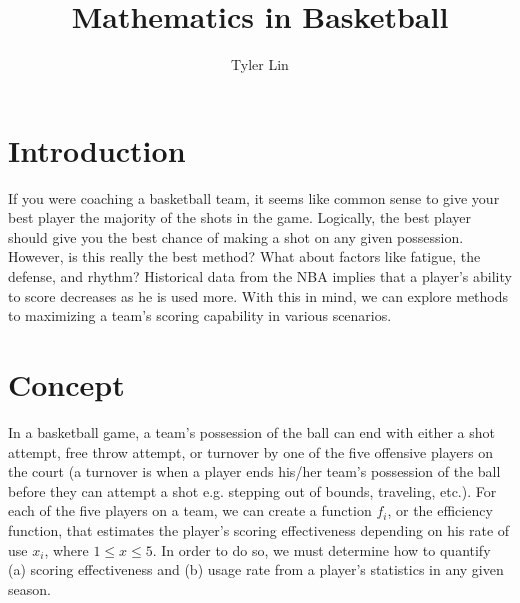 \documentclass{article}
\title{Mathematics in Basketball}
\author{Tyler Lin}
\begin{document}
\maketitle
\section*{Introduction}
If you were coaching a basketball team, it seems like common sense to give your best player the majority of the shots in the game. Logically, the best player should give you the best chance of making a shot on any given possession. However, is this really the best method? What about factors like fatigue, the defense, and rhythm? Historical data from the NBA implies that a player's ability to score decreases as he is used more. With this in mind, we can explore methods to maximizing a team's scoring capability in various scenarios.
\section*{Concept}
In a basketball game, a team's possession of the ball can end with either a shot attempt, free throw attempt, or turnover by one of the five offensive players on the court (a turnover is when a player ends his/her team’s possession of the ball before they can attempt a shot e.g. stepping out of bounds, traveling, etc.).
\newline For each of the five players on a team, we can create a function $f_i$, or the efficiency function, that estimates the player's scoring effectiveness depending on his rate of use $x_i$, where $1\leq x\leq5$. In order to do so, we must determine how to quantify (a) scoring effectiveness and (b) usage rate from a player's statistics in any given season.
\end{document}
